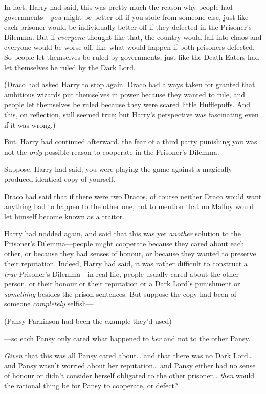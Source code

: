 In fact, Harry had said, this was pretty much the reason why people had
governments---\emph{you} might be better off if you stole from someone
else, just like each prisoner would be individually better off if they
defected in the Prisoner's Dilemma. But if \emph{everyone} thought like
that, the country would fall into chaos and everyone would be worse off,
like what would happen if both prisoners defected. So people let
themselves be ruled by governments, just like the Death Eaters had let
themselves be ruled by the Dark Lord.

(Draco had asked Harry to stop again. Draco had always taken for granted
that ambitious wizards put themselves in power because they wanted to
rule, and people let themselves be ruled because they were scared little
Hufflepuffs. And this, on reflection, still seemed true; but Harry's
perspective was fascinating even if it was wrong.)

But, Harry had continued afterward, the fear of a third party punishing
you was not the \emph{only} possible reason to cooperate in the
Prisoner's Dilemma.

Suppose, Harry had said, you were playing the game against a magically
produced identical copy of yourself.

Draco had said that if there were two Dracos, of course neither Draco
would want anything bad to happen to the other one, not to mention that
no Malfoy would let himself become known as a traitor.

Harry had nodded again, and said that this was yet \emph{another}
solution to the Prisoner's Dilemma---people might cooperate because they
cared about each other, or because they had senses of honour, or because
they wanted to preserve their reputation. Indeed, Harry had said, it was
rather difficult to construct a \emph{true} Prisoner's Dilemma---in real
life, people usually cared about the other person, or their honour or
their reputation or a Dark Lord's punishment or \emph{something} besides
the prison sentences. But suppose the copy had been of someone
\emph{completely} selfish---

(Pansy Parkinson had been the example they'd used)

---so each Pansy only cared what happened to \emph{her} and not to the
other Pansy.

\emph{Given} that this was all Pansy cared about\ldots{} and that there
was no Dark Lord\ldots{} and Pansy wasn't worried about her
reputation\ldots{} and Pansy either had no sense of honour or didn't
consider herself obligated to the other prisoner\ldots{} \emph{then}
would the rational thing be for Pansy to cooperate, or defect?

